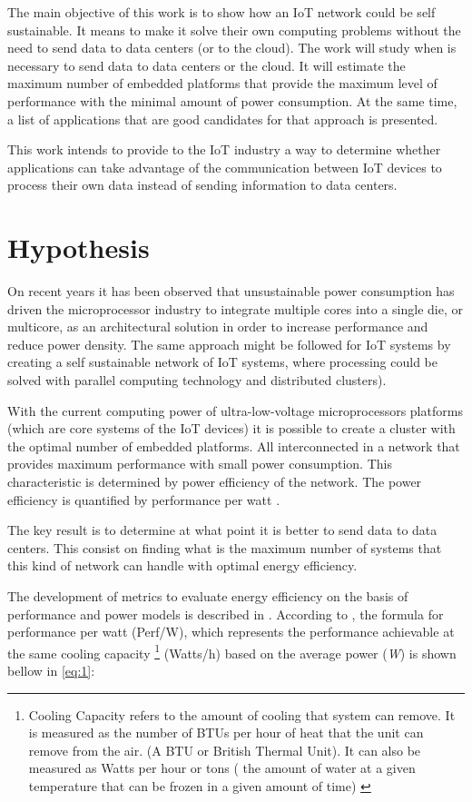 The main objective of this work is to show how an IoT network could be self
sustainable. It means to make it solve their own computing problems without the
need to send data to data centers (or to the cloud). The work will study when
is necessary to send data to data centers or the cloud.
It will estimate the maximum number of embedded platforms that provide the
maximum level of performance with the minimal amount of power consumption. At the
same time, a list of applications that are good candidates for that approach is
presented. 

This work intends to provide to the IoT industry a way  to determine whether
applications can take advantage of the communication between  IoT devices
to process their own data instead of sending information to data centers.

\section{Hypothesis} \noindent

On recent years it has been observed that unsustainable power consumption has
driven the microprocessor industry to integrate multiple cores into a single
die, or multicore, as an architectural solution in order to increase
performance and reduce power density. The same approach might be followed for
IoT systems by creating a self sustainable network of IoT systems, where
processing could be solved with parallel computing technology and distributed
clusters).

With the current computing power of ultra-low-voltage microprocessors
platforms (which are core systems of the IoT devices) it is possible to create a cluster
with the optimal number of embedded platforms. All interconnected in a
network that provides maximum performance with small
power consumption. This characteristic is determined by power efficiency of
the network. The power efficiency is quantified by performance per watt
\cite{Jun}.

The key result is to determine at what point it is better to send data to data
centers. This consist on finding what is the maximum number of systems that
this kind of network can handle with optimal energy efficiency.

The development of metrics to evaluate energy efficiency on the basis of
performance and power models is described in \cite{Dong}. According to
\cite{Dong}, the formula for performance per watt (Perf/W), which represents the
performance achievable at the same cooling capacity \footnote{Cooling
Capacity refers to the amount of cooling that system can remove. It is measured as the
number of BTUs per hour of heat that the unit can remove from the air. (A BTU
or British Thermal Unit). It can also be measured as Watts per hour or tons (
the amount of water at a given temperature that can be frozen in a given amount
of time) \cite{Siegenthaler} } (Watts/h) based on the average power
(\textit{W}) is shown bellow in \ref{eq:1}:

